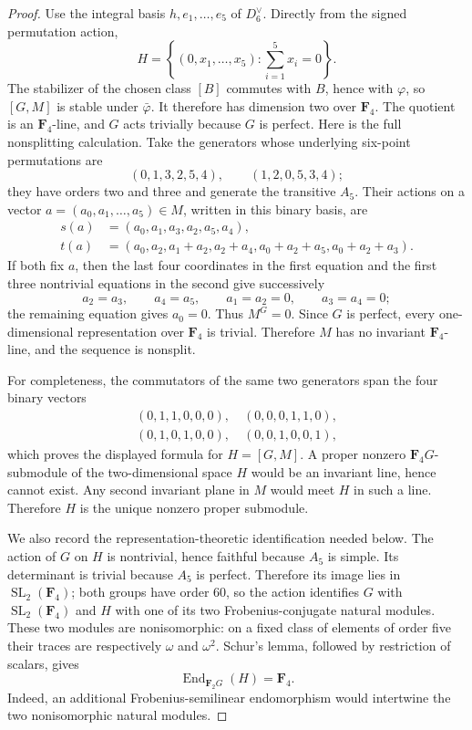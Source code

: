 \documentclass[11pt]{article}
\theoremstyle{definition}
\theoremstyle{remark}
\newcommand{\F}{\mathbf F}
\newcommand{\End}{\operatorname{End}}
\begin{document}
\begin{proof}
Use the integral basis \(h,e_1,\ldots,e_5\) of \(D_6^\vee\).  Directly from
the signed permutation action,
\[
 H=\left\{(0,x_1,\ldots,x_5):
                   \sum_{i=1}^5x_i=0\right\}.
\]
The stabilizer of the chosen class \([B]\) commutes with \(B\), hence with \(\varphi\), so
\([G,M]\) is stable under \(\bar\varphi\).  It therefore has dimension two
over \(\F_4\).
The quotient is an \(\F_4\)-line, and \(G\) acts trivially because \(G\) is
perfect.  Here is the full nonsplitting calculation.  Take the generators
whose underlying six-point permutations are
\[
 (0,1,3,2,5,4),\qquad (1,2,0,5,3,4);
\]
they have orders two and three and generate the transitive \(A_5\).  Their
actions on a vector
\(a=(a_0,a_1,\ldots,a_5)\in M\), written in this binary basis, are
\[
\begin{aligned}
 s(a)&=(a_0,a_1,a_3,a_2,a_5,a_4),\\
 t(a)&=(a_0,a_2,a_1+a_2,a_2+a_4,
              a_0+a_2+a_5,a_0+a_2+a_3).
\end{aligned}
\]
If both fix \(a\), then the last four coordinates in the first equation and
the first three nontrivial equations in the second give successively
\[
 a_2=a_3,\qquad a_4=a_5,\qquad
 a_1=a_2=0,\qquad a_3=a_4=0;
\]
the remaining equation gives \(a_0=0\).  Thus \(M^G=0\).  Since \(G\) is
perfect, every one-dimensional representation over \(\F_4\) is trivial.
Therefore \(M\) has no invariant \(\F_4\)-line, and the sequence is
nonsplit.

For completeness, the commutators of the same two generators span the four
binary vectors
\[
\begin{gathered}
 (0,1,1,0,0,0),\quad (0,0,0,1,1,0),\\
 (0,1,0,1,0,0),\quad (0,0,1,0,0,1),
\end{gathered}
\]
which proves the displayed formula for \(H=[G,M]\).  A proper nonzero
\(\F_4G\)-submodule of the two-dimensional space \(H\) would be an invariant
line, hence cannot exist.  Any second invariant plane in \(M\) would meet
\(H\) in such a line.  Therefore \(H\) is the unique nonzero proper
submodule.

We also record the representation-theoretic identification needed below.
The action of \(G\) on \(H\) is nontrivial, hence faithful because \(A_5\) is
simple.  Its determinant is trivial because \(A_5\) is perfect.  Therefore
its image lies in \(\operatorname{SL}_2(\F_4)\); both groups have order
\(60\), so the action identifies \(G\) with
\(\operatorname{SL}_2(\F_4)\) and \(H\) with one of its two
Frobenius-conjugate natural modules.  These two modules are nonisomorphic:
on a fixed class of elements of order five their traces are respectively
\(\omega\) and \(\omega^2\).  Schur's lemma, followed by restriction of
scalars, gives
\[
                         \End_{\F_2G}(H)=\F_4.
\]
Indeed, an additional Frobenius-semilinear endomorphism would intertwine the
two nonisomorphic natural modules.


\end{proof}
\end{document}
